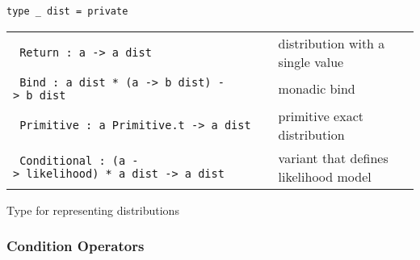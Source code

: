 \protect\hyperlink{type-dist}{}\texttt{type\ \_\ dist}\texttt{\ =\ private\ }

\begin{longtable}[c]{@{}ll@{}}
\toprule
\begin{minipage}[t]{0.47\columnwidth}\raggedright\strut
\protect\hyperlink{type-dist.Return}{}\texttt{\textbar{}\ }\texttt{Return\ :\ \textquotesingle{}a\ -\textgreater{}\ \textquotesingle{}a\ dist}
\strut\end{minipage} &
\begin{minipage}[t]{0.47\columnwidth}\raggedright\strut
distribution with a single value
\strut\end{minipage}\tabularnewline
\begin{minipage}[t]{0.47\columnwidth}\raggedright\strut
\protect\hyperlink{type-dist.Bind}{}\texttt{\textbar{}\ }\texttt{Bind\ :\ \textquotesingle{}a\ dist\ *\ (\textquotesingle{}a\ -\textgreater{}\ \textquotesingle{}b\ dist)\ -\textgreater{}\ \textquotesingle{}b\ dist}
\strut\end{minipage} &
\begin{minipage}[t]{0.47\columnwidth}\raggedright\strut
monadic bind
\strut\end{minipage}\tabularnewline
\begin{minipage}[t]{0.47\columnwidth}\raggedright\strut
\protect\hyperlink{type-dist.Primitive}{}\texttt{\textbar{}\ }\texttt{Primitive\ :\ \textquotesingle{}a\ Primitive.t\ -\textgreater{}\ \textquotesingle{}a\ dist}
\strut\end{minipage} &
\begin{minipage}[t]{0.47\columnwidth}\raggedright\strut
primitive exact distribution
\strut\end{minipage}\tabularnewline
\begin{minipage}[t]{0.47\columnwidth}\raggedright\strut
\protect\hyperlink{type-dist.Conditional}{}\texttt{\textbar{}\ }\texttt{Conditional\ :\ (\textquotesingle{}a\ -\textgreater{}\ likelihood)\ *\ \textquotesingle{}a\ dist\ -\textgreater{}\ \textquotesingle{}a\ dist}
\strut\end{minipage} &
\begin{minipage}[t]{0.47\columnwidth}\raggedright\strut
variant that defines likelihood model
\strut\end{minipage}\tabularnewline
\bottomrule
\end{longtable}

Type for representing distributions

\hypertarget{distux5fmonad}{\subsubsection{\texorpdfstring{\protect\hyperlink{distux5fmonad}{}Condition
Operators}{Condition Operators}}\label{distux5fmonad}}

